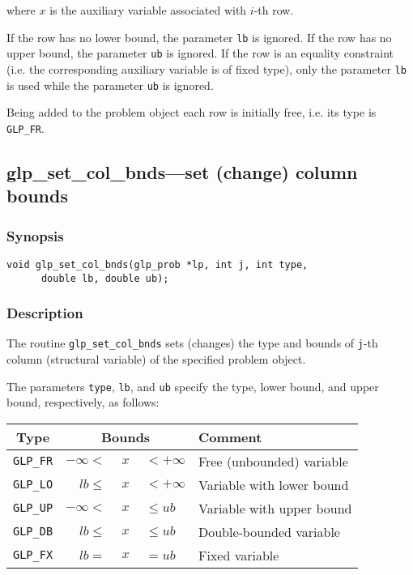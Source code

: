 \noindent
where $x$ is the auxiliary variable associated with $i$-th row.

If the row has no lower bound, the parameter \verb|lb| is ignored. If
the row has no upper bound, the parameter \verb|ub| is ignored. If the
row is an equality constraint (i.e. the corresponding auxiliary variable
is of fixed type), only the parameter \verb|lb| is used while the
parameter \verb|ub| is ignored.

Being added to the problem object each row is initially free, i.e. its
type is \verb|GLP_FR|.

\newpage

\subsection{glp\_set\_col\_bnds---set (change) column bounds}

\subsubsection*{Synopsis}

\begin{verbatim}
void glp_set_col_bnds(glp_prob *lp, int j, int type,
      double lb, double ub);
\end{verbatim}

\subsubsection*{Description}

The routine \verb|glp_set_col_bnds| sets (changes) the type and bounds
of \verb|j|-th column (structural variable) of the specified problem
object.

The parameters \verb|type|, \verb|lb|, and \verb|ub| specify the type,
lower bound, and upper bound, respectively, as follows:

\begin{center}
\begin{tabular}{cr@{}c@{}ll}
Type & \multicolumn{3}{c}{Bounds} & Comment \\
\hline
\verb|GLP_FR| & $-\infty <$ &$\ x\ $& $< +\infty$
   & Free (unbounded) variable \\
\verb|GLP_LO| & $lb \leq$ &$\ x\ $& $< +\infty$
   & Variable with lower bound \\
\verb|GLP_UP| & $-\infty <$ &$\ x\ $& $\leq ub$
   & Variable with upper bound \\
\verb|GLP_DB| & $lb \leq$ &$\ x\ $& $\leq ub$
   & Double-bounded variable \\
\verb|GLP_FX| & $lb =$ &$\ x\ $& $= ub$
   & Fixed variable \\
\end{tabular}
\end{center}

